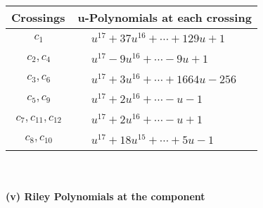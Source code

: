 \documentclass[1p]{elsarticle_modified}
\theoremstyle{definition}
\begin{document}
\begin{tabular}{m{50pt}|m{274pt}}
Crossings & \hspace{64pt}u-Polynomials at each crossing \\
\hline $$\begin{aligned}c_{1}\end{aligned}$$&$\begin{aligned}
&u^{17}+37 u^{16}+\cdots+129 u+1
\end{aligned}$\\
\hline $$\begin{aligned}c_{2},c_{4}\end{aligned}$$&$\begin{aligned}
&u^{17}-9 u^{16}+\cdots-9 u+1
\end{aligned}$\\
\hline $$\begin{aligned}c_{3},c_{6}\end{aligned}$$&$\begin{aligned}
&u^{17}+3 u^{16}+\cdots+1664 u-256
\end{aligned}$\\
\hline $$\begin{aligned}c_{5},c_{9}\end{aligned}$$&$\begin{aligned}
&u^{17}+2 u^{16}+\cdots- u-1
\end{aligned}$\\
\hline $$\begin{aligned}c_{7},c_{11},c_{12}\end{aligned}$$&$\begin{aligned}
&u^{17}+2 u^{16}+\cdots- u+1
\end{aligned}$\\
\hline $$\begin{aligned}c_{8},c_{10}\end{aligned}$$&$\begin{aligned}
&u^{17}+18 u^{15}+\cdots+5 u-1
\end{aligned}$\\
\hline
\end{tabular}\\~\\
\newpage\renewcommand{\arraystretch}{1}
\flushleft \textbf{(v) Riley Polynomials at the component}\newline \\
\end{document}
